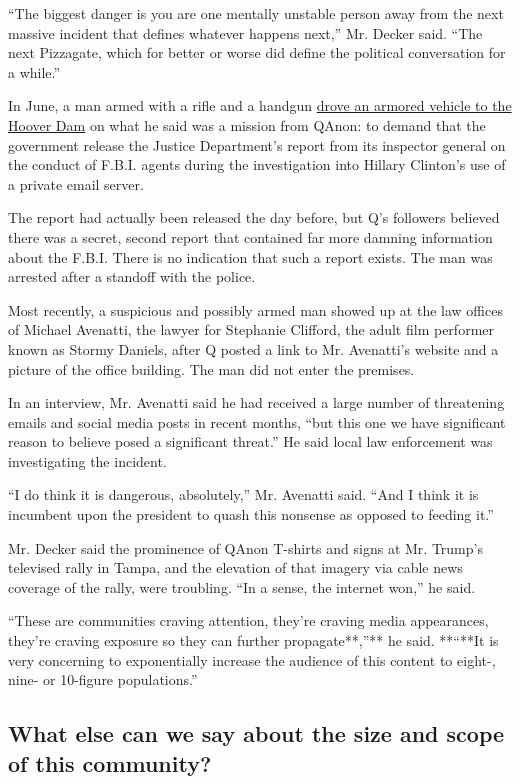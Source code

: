``The biggest danger is you are one mentally unstable person away from
the next massive incident that defines whatever happens next,'' Mr.
Decker said. ``The next Pizzagate, which for better or worse did define
the political conversation for a while.''

In June, a man armed with a rifle and a handgun
\href{https://www.buzzfeednews.com/article/skbaer/qanon-believer-arrested-hoover-dam}{drove
an armored vehicle to the Hoover Dam} on what he said was a mission from
QAnon: to demand that the government release the Justice Department's
report from its inspector general on the conduct of F.B.I. agents during
the investigation into Hillary Clinton's use of a private email server.

The report had actually been released the day before, but Q's followers
believed there was a secret, second report that contained far more
damning information about the F.B.I. There is no indication that such a
report exists. The man was arrested after a standoff with the police.

Most recently, a suspicious and possibly armed man showed up at the law
offices of Michael Avenatti, the lawyer for Stephanie Clifford, the
adult film performer known as Stormy Daniels, after Q posted a link to
Mr. Avenatti's website and a picture of the office building. The man did
not enter the premises.

In an interview, Mr. Avenatti said he had received a large number of
threatening emails and social media posts in recent months, ``but this
one we have significant reason to believe posed a significant threat.''
He said local law enforcement was investigating the incident.

``I do think it is dangerous, absolutely,'' Mr. Avenatti said. ``And I
think it is incumbent upon the president to quash this nonsense as
opposed to feeding it.''

Mr. Decker said the prominence of QAnon T-shirts and signs at Mr.
Trump's televised rally in Tampa, and the elevation of that imagery via
cable news coverage of the rally, were troubling. ``In a sense, the
internet won,'' he said.

``These are communities craving attention, they're craving media
appearances, they're craving exposure so they can further
propagate**,''** he said. **``**It is very concerning to exponentially
increase the audience of this content to eight-, nine- or 10-figure
populations.''

\hypertarget{what-else-can-we-say-about-the-size-and-scope-of-this-community}{%
\subsection{What else can we say about the size and scope of this
community?}\label{what-else-can-we-say-about-the-size-and-scope-of-this-community}}

